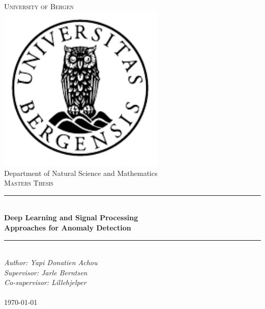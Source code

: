 \documentclass[../Main/thesis.tex]{subfiles}
\begin{document}

\newcommand{\HRule}{\rule{\linewidth}{0.5mm}}

\begin{titlepage}
\begin{center}
\textsc{\Huge University of Bergen}\\[0.4cm]
\includegraphics[width=8cm]{../fig/uib} \\[0.5cm]

\large Department of Natural Science and Mathematics\\[0.7cm]
\textsc{\huge Masters Thesis}\\[0.4cm]
\HRule \\[0.4cm]
{ \huge \bfseries Deep Learning and Signal Processing    \\  Approaches for Anomaly Detection}\\[0.5cm]
\HRule \\[1.0cm]

\emph{Author: Yapi Donatien Achou}\\
\emph{Supervisor: Jarle Berntsen}\\
\emph{Co-supervisor: Lillehjelper}\\

\paragraph*{}
\end{center}
\vfill
\begin{center}
{\large \today}
\end{center}
\end{titlepage}
\end{document}
